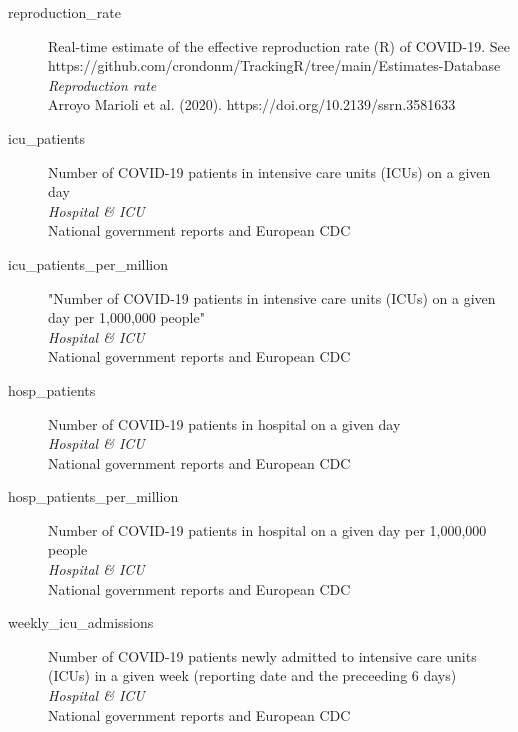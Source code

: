 \begin{description}
    \item[reproduction\_rate] 
    Real-time estimate of the effective reproduction rate (R) of COVID-19. See https://github.com/crondonm/TrackingR/tree/main/Estimates-Database\\
    \emph{\footnotesize{Reproduction rate}}\\
    \footnotesize{Arroyo Marioli et al. (2020). https://doi.org/10.2139/ssrn.3581633}\\

    \item[icu\_patients] 
    Number of COVID-19 patients in intensive care units (ICUs) on a given day\\
    \emph{\footnotesize{Hospital \& ICU}}\\
    \footnotesize{National government reports and European CDC}\\

    \item[icu\_patients\_per\_million] 
    "Number of COVID-19 patients in intensive care units (ICUs) on a given day per 1,000,000 people"\\
    \emph{\footnotesize{Hospital \& ICU}}\\
    \footnotesize{National government reports and European CDC}\\

    \item[hosp\_patients] 
    Number of COVID-19 patients in hospital on a given day\\
    \emph{\footnotesize{Hospital \& ICU}}\\
    \footnotesize{National government reports and European CDC}\\

    \item[hosp\_patients\_per\_million] 
    Number of COVID-19 patients in hospital on a given day per 1,000,000 people\\
    \emph{\footnotesize{Hospital \& ICU}}\\
    \footnotesize{National government reports and European CDC}\\

    \item[weekly\_icu\_admissions] 
    Number of COVID-19 patients newly admitted to intensive care units (ICUs) in a given week (reporting date and the preceeding 6 days)\\
    \emph{\footnotesize{Hospital \& ICU}}\\
    \footnotesize{National government reports and European CDC}\\


\end{description}
